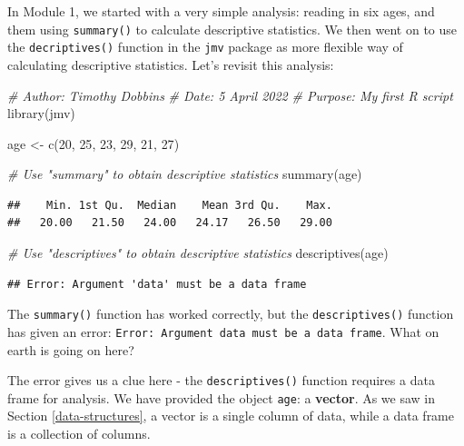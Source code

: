 \documentclass[
]{memoir}
\newenvironment{Shaded}{\begin{snugshade}}{\end{snugshade}}
\newcommand{\CommentTok}[1]{\textcolor[rgb]{0.56,0.35,0.01}{\textit{#1}}}
\newcommand{\DecValTok}[1]{\textcolor[rgb]{0.00,0.00,0.81}{#1}}
\newcommand{\FunctionTok}[1]{\textcolor[rgb]{0.00,0.00,0.00}{#1}}
\newcommand{\NormalTok}[1]{#1}
\newcommand{\OtherTok}[1]{\textcolor[rgb]{0.56,0.35,0.01}{#1}}
\begin{document}
In Module 1, we started with a very simple analysis: reading in six ages, and them using \texttt{summary()} to calculate descriptive statistics. We then went on to use the \texttt{decriptives()} function in the \texttt{jmv} package as more flexible way of calculating descriptive statistics. Let's revisit this analysis:

\begin{Shaded}
\begin{Highlighting}[]
\CommentTok{\# Author: Timothy Dobbins}
\CommentTok{\# Date: 5 April 2022}
\CommentTok{\# Purpose: My first R script}
\FunctionTok{library}\NormalTok{(jmv)}

\NormalTok{age }\OtherTok{\textless{}{-}} \FunctionTok{c}\NormalTok{(}\DecValTok{20}\NormalTok{, }\DecValTok{25}\NormalTok{, }\DecValTok{23}\NormalTok{, }\DecValTok{29}\NormalTok{, }\DecValTok{21}\NormalTok{, }\DecValTok{27}\NormalTok{)}

\CommentTok{\# Use "summary" to obtain descriptive statistics}
\FunctionTok{summary}\NormalTok{(age)}
\end{Highlighting}
\end{Shaded}

\begin{verbatim}
##    Min. 1st Qu.  Median    Mean 3rd Qu.    Max. 
##   20.00   21.50   24.00   24.17   26.50   29.00
\end{verbatim}

\begin{Shaded}
\begin{Highlighting}[]
\CommentTok{\# Use "descriptives" to obtain descriptive statistics}
\FunctionTok{descriptives}\NormalTok{(age)}
\end{Highlighting}
\end{Shaded}

\begin{verbatim}
## Error: Argument 'data' must be a data frame
\end{verbatim}

The \texttt{summary()} function has worked correctly, but the \texttt{descriptives()} function has given an error: \texttt{Error:\ Argument\ \textquotesingle{}data\textquotesingle{}\ must\ be\ a\ data\ frame}. What on earth is going on here?

The error gives us a clue here - the \texttt{descriptives()} function requires a data frame for analysis. We have provided the object \texttt{age}: a \textbf{vector}. As we saw in Section \ref{data-structures}, a vector is a single column of data, while a data frame is a collection of columns.
\end{document}
